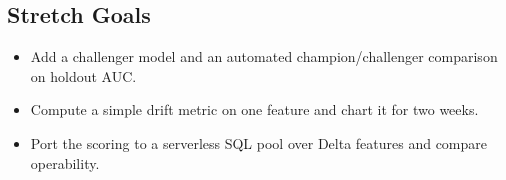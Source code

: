 \subsection*{Stretch Goals}
\begin{itemize}
    \item Add a challenger model and an automated champion/challenger comparison on holdout AUC.
    \item Compute a simple drift metric on one feature and chart it for two weeks.
    \item Port the scoring to a serverless SQL pool over Delta features and compare operability.
\end{itemize}
